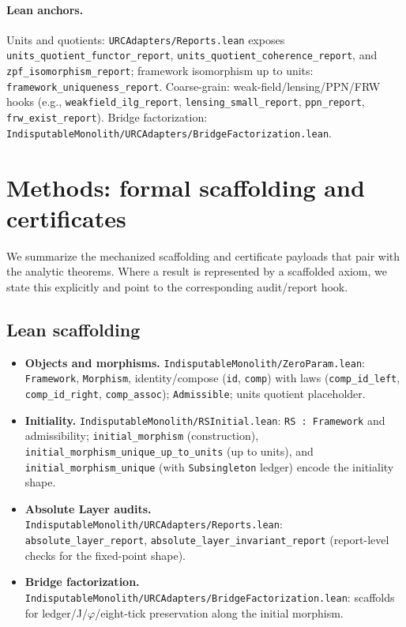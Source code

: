 \documentclass[11pt]{article}
\begin{document}
\paragraph{Lean anchors.} Units and quotients: \texttt{URCAdapters/Reports.lean} exposes \texttt{units\_quotient\_functor\_report}, \texttt{units\_quotient\_coherence\_report}, and \texttt{zpf\_isomorphism\_report}; framework isomorphism up to units: \texttt{framework\_uniqueness\_report}. Coarse\mbox{-}grain: weak\mbox{-}field/lensing/PPN/FRW hooks (e.g., \texttt{weakfield\_ilg\_report}, \texttt{lensing\_small\_report}, \texttt{ppn\_report}, \texttt{frw\_exist\_report}). Bridge factorization: \texttt{IndisputableMonolith/URCAdapters/BridgeFactorization.lean}.

\section{Methods: formal scaffolding and certificates}
We summarize the mechanized scaffolding and certificate payloads that pair with the analytic theorems. Where a result is represented by a scaffolded axiom, we state this explicitly and point to the corresponding audit/report hook.

\subsection{Lean scaffolding}
\begin{itemize}
  \item \textbf{Objects and morphisms.} \texttt{IndisputableMonolith/ZeroParam.lean}: \texttt{Framework}, \texttt{Morphism}, identity/compose (\texttt{id}, \texttt{comp}) with laws (\texttt{comp\_id\_left}, \texttt{comp\_id\_right}, \texttt{comp\_assoc}); \texttt{Admissible}; units quotient placeholder.
  \item \textbf{Initiality.} \texttt{IndisputableMonolith/RSInitial.lean}: \texttt{RS : Framework} and admissibility; \texttt{initial\_morphism} (construction), \texttt{initial\_morphism\_unique\_up\_to\_units} (up to units), and \texttt{initial\_morphism\_unique} (with \texttt{Subsingleton} ledger) encode the initiality shape.
  \item \textbf{Absolute Layer audits.} \texttt{IndisputableMonolith/URCAdapters/Reports.lean}: \texttt{absolute\_layer\_report}, \texttt{absolute\_layer\_invariant\_report} (report\mbox{-}level checks for the fixed\mbox{-}point shape).
  \item \textbf{Bridge factorization.} \texttt{IndisputableMonolith/URCAdapters/BridgeFactorization.lean}: scaffolds for ledger/J/\(\varphi\)/eight\mbox{-}tick preservation along the initial morphism.
\end{itemize}
\end{document}
